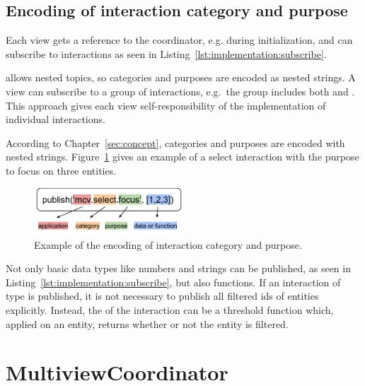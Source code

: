 \subsection{Encoding of interaction category and purpose}
Each view gets a reference to the coordinator, e.g. during initialization, and can subscribe to interactions as seen in Listing~\ref{lst:implementation:subscribe}.

 allows nested topics, so categories and purposes are encoded as nested strings.
A view can subscribe to a group of interactions, e.g.\ the group  includes both  and .
This approach gives each view self-responsibility of the implementation of individual interactions.

According to Chapter~\ref{sec:concept}, categories and purposes are encoded with nested strings.
Figure~\ref{fig:implementation:encoding} gives an example of a select interaction with the purpose to focus on three entities.

\begin{figure}[ht]
  \centering
  \includegraphics[width=0.5\textwidth]{figures/implementation/Encoding}
  \caption{%
    Example of the encoding of interaction category and purpose.
  }\label{fig:implementation:encoding}
\end{figure}

Not only basic data types like numbers and strings can be published, as seen in Listing~\ref{lst:implementation:subscribe}, but also functions.
If an interaction of type  is published, it is not necessary to publish all filtered ids of entities explicitly.
Instead, the  of the interaction can be a threshold function which, applied on an entity, returns whether or not the entity is filtered.




\section{MultiviewCoordinator}

